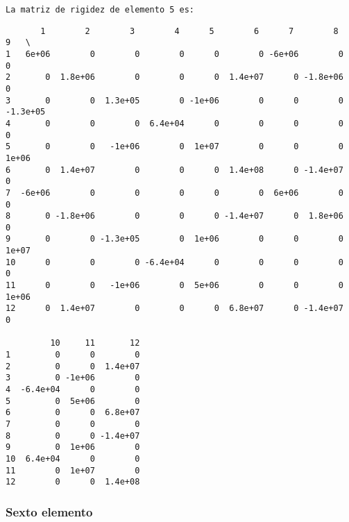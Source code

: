 \documentclass{article}
\begin{document}
    \begin{Verbatim}[commandchars=\\\{\}]
La matriz de rigidez de elemento 5 es:
    \end{Verbatim}

    
    \begin{verbatim}
       1        2        3        4      5        6      7        8        9   \
1   6e+06        0        0        0      0        0 -6e+06        0        0   
2       0  1.8e+06        0        0      0  1.4e+07      0 -1.8e+06        0   
3       0        0  1.3e+05        0 -1e+06        0      0        0 -1.3e+05   
4       0        0        0  6.4e+04      0        0      0        0        0   
5       0        0   -1e+06        0  1e+07        0      0        0    1e+06   
6       0  1.4e+07        0        0      0  1.4e+08      0 -1.4e+07        0   
7  -6e+06        0        0        0      0        0  6e+06        0        0   
8       0 -1.8e+06        0        0      0 -1.4e+07      0  1.8e+06        0   
9       0        0 -1.3e+05        0  1e+06        0      0        0    1e+07   
10      0        0        0 -6.4e+04      0        0      0        0        0   
11      0        0   -1e+06        0  5e+06        0      0        0    1e+06   
12      0  1.4e+07        0        0      0  6.8e+07      0 -1.4e+07        0   

         10     11       12  
1         0      0        0  
2         0      0  1.4e+07  
3         0 -1e+06        0  
4  -6.4e+04      0        0  
5         0  5e+06        0  
6         0      0  6.8e+07  
7         0      0        0  
8         0      0 -1.4e+07  
9         0  1e+06        0  
10  6.4e+04      0        0  
11        0  1e+07        0  
12        0      0  1.4e+08  
    \end{verbatim}

    
    \subsubsection{Sexto elemento}\label{sexto-elemento}
\end{document}

